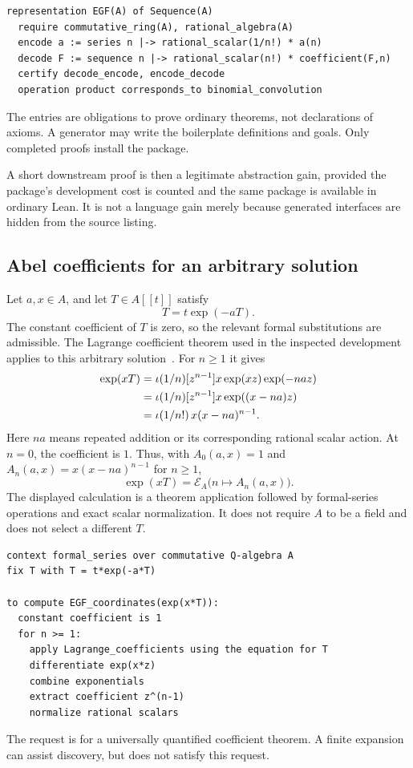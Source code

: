 \documentclass[11pt,a4paper]{article}
\newcommand{\code}[1]{\texttt{\detokenize{#1}}}
\newcommand{\coeff}[2]{[#1]#2}
\theoremstyle{definition}
\theoremstyle{remark}
\begin{document}
\begin{lstlisting}
representation EGF(A) of Sequence(A)
  require commutative_ring(A), rational_algebra(A)
  encode a := series n |-> rational_scalar(1/n!) * a(n)
  decode F := sequence n |-> rational_scalar(n!) * coefficient(F,n)
  certify decode_encode, encode_decode
  operation product corresponds_to binomial_convolution
\end{lstlisting}
The \code{certify} entries are obligations to prove ordinary theorems, not declarations of axioms. A generator may write the boilerplate definitions and goals. Only completed proofs install the package.

A short downstream proof is then a legitimate abstraction gain, provided the package's development cost is counted and the same package is available in ordinary Lean. It is not a language gain merely because generated interfaces are hidden from the source listing.

\subsection{Abel coefficients for an arbitrary solution}
Let $a,x\in A$, and let $T\in A[[t]]$ satisfy
\begin{equation}\label{eq:abeleq}
T=t\exp(-aT).
\end{equation}
The constant coefficient of $T$ is zero, so the relevant formal substitutions are admissible. The Lagrange coefficient theorem used in the inspected development applies to this arbitrary solution~\cite{abel}. For $n\ge1$ it gives
\begin{align}
\coeff{t^n}{\exp(xT)}
 &=\iota(1/n)\coeff{z^{n-1}}{x\exp(xz)\exp(-naz)}\notag\\
 &=\iota(1/n)\coeff{z^{n-1}}{x\exp((x-na)z)}\notag\\
 &=\iota(1/n!)\,x(x-na)^{n-1}.\label{eq:abelcoeff}
\end{align}
Here $na$ means repeated addition or its corresponding rational scalar action. At $n=0$, the coefficient is $1$. Thus, with $A_0(a,x)=1$ and $A_n(a,x)=x(x-na)^{n-1}$ for $n\ge1$,
\[
\exp(xT)=\mathcal E_A\bigl(n\mapsto A_n(a,x)\bigr).
\]
The displayed calculation is a theorem application followed by formal-series operations and exact scalar normalization. It does not require $A$ to be a field and does not select a different $T$.

\begin{lstlisting}
context formal_series over commutative Q-algebra A
fix T with T = t*exp(-a*T)

to compute EGF_coordinates(exp(x*T)):
  constant coefficient is 1
  for n >= 1:
    apply Lagrange_coefficients using the equation for T
    differentiate exp(x*z)
    combine exponentials
    extract coefficient z^(n-1)
    normalize rational scalars
\end{lstlisting}
The request is for a universally quantified coefficient theorem. A finite expansion can assist discovery, but does not satisfy this request.
\end{document}
